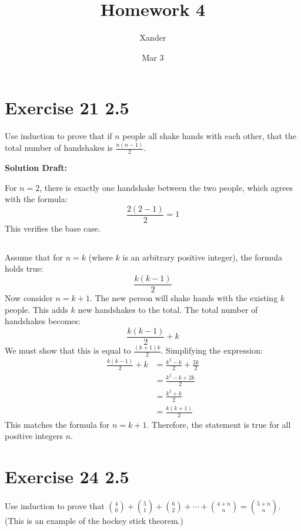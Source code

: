 \documentclass{article}
\title{Homework 4}
\author{Xander}
\date{Mar 3}
\begin{document}
\maketitle

\section*{Exercise 21 2.5}  

Use induction to prove that if \( n \) people all shake hands with each other, that the total number of handshakes is \( \frac{n(n-1)}{2} \).

\vspace{0.5cm}
\noindent\textbf{Solution Draft:} 
\vspace{0.2cm}

For \( n = 2 \), there is exactly one handshake between the two people, which agrees with the formula:
\[ \frac{2(2-1)}{2} = 1 \]
This verifies the base case.

\subsection*{}
Assume that for \( n = k \) (where \( k \) is an arbitrary positive integer), the formula holds true:
\[ \frac{k(k-1)}{2} \]
Now consider \( n = k + 1 \). The new person will shake hands with the existing \( k \) people. This adds \( k \) new handshakes to the total. The total number of handshakes becomes:
\[ \frac{k(k-1)}{2} + k \]
We must show that this is equal to \( \frac{(k+1)k}{2} \). Simplifying the expression:
\begin{align*}
\frac{k(k-1)}{2} + k &= \frac{k^2 - k}{2} + \frac{2k}{2} \\
&= \frac{k^2 - k + 2k}{2} \\
&= \frac{k^2 + k}{2} \\
&= \frac{k(k+1)}{2}
\end{align*}
This matches the formula for \( n = k + 1 \). Therefore, the statement is true for all positive integers \( n \).


\section*{Exercise 24 2.5}  

Use induction to prove that \( {4 \choose 0} + {5 \choose 1} + {6 \choose 2} + \cdots + {4+n \choose n} = {5+n \choose n} \). (This is an example of the hockey stick theorem.)
\end{document}
